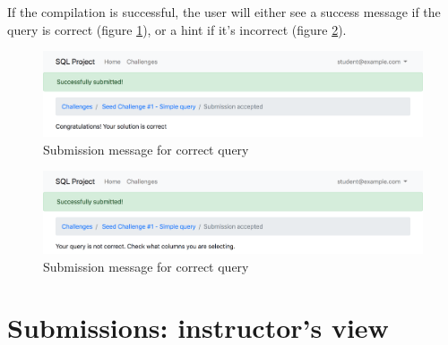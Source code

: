 If the compilation is successful, the user will either see a success message if the query is correct (figure \ref{fig:app:submit_correct}), or a hint if it's incorrect (figure \ref{fig:app:submit_incorrect}).

\begin{figure}[ht]
    \centering
    \includegraphics[width=\textwidth/4*3]{Appendices/submit_correct.png}
    \caption{Submission message for correct query}
    \label{fig:app:submit_correct}
\end{figure}

\begin{figure}[ht]
    \centering
    \includegraphics[width=\textwidth/4*3]{Appendices/submit_hint.png}
    \caption{Submission message for correct query}
    \label{fig:app:submit_incorrect}
\end{figure}

\section{Submissions: instructor's view}